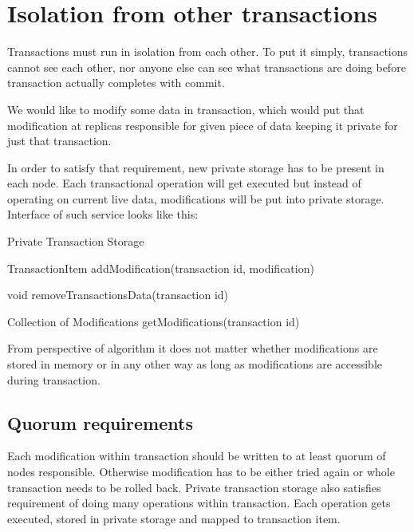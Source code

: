 











\section{Isolation from other transactions}
Transactions must run in isolation from each other. To put it simply, transactions cannot see each other, nor anyone else can see what transactions are doing before transaction actually completes with commit.


We would like to modify some data in transaction, which would put that modification at replicas responsible for given piece of data keeping it private for just that transaction.


In order to satisfy that requirement, new private storage has to be present in each node.
Each transactional operation will get executed but instead of operating on current live data, modifications will be put into private storage. Interface of such service looks like this:


Private Transaction Storage {
        TransactionItem addModification(transaction id, modification)


        void removeTransactionsData(transaction id)


          Collection of Modifications getModifications(transaction id)        
}


From perspective of algorithm it does not matter whether modifications are stored in memory or in any other way as long as modifications are accessible during transaction.


\subsection{Quorum requirements}
Each modification within transaction should be written to at least quorum of nodes responsible. Otherwise modification has to be either tried again or whole transaction needs to be rolled back.
Private transaction storage also satisfies requirement of doing many operations within transaction. Each operation gets executed, stored in private storage and mapped to transaction item.


